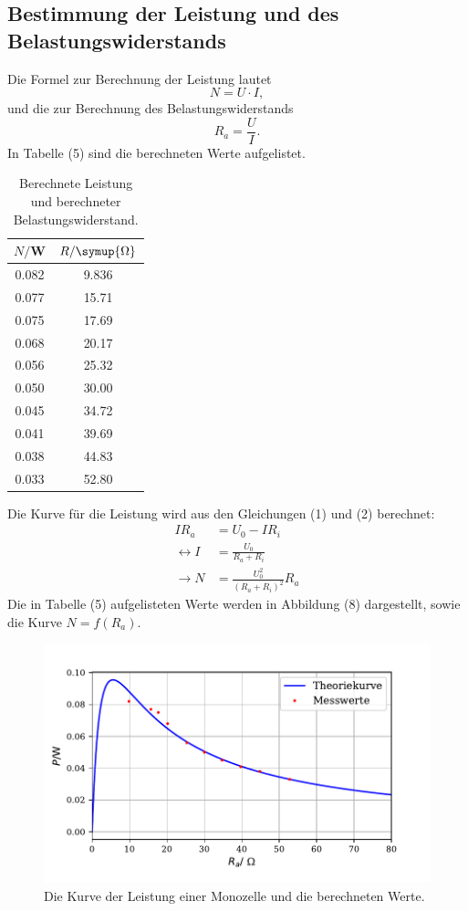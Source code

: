 \subsection{Bestimmung der Leistung und des Belastungswiderstands}
Die Formel zur Berechnung der Leistung lautet
\begin{equation}
N = U \cdot I ,
\end{equation}
\noindent und die zur Berechnung des Belastungswiderstands
\begin{equation}
R_a = \frac{U}{I} .
\end{equation}
\noindent In Tabelle (5) sind die berechneten Werte aufgelistet.
\begin{table}[H]
  \centering
  \caption{Berechnete Leistung und berechneter Belastungswiderstand.}
  \begin{tabular}{c c}
    \toprule
    $N/$W & $R/ \symup{\Omega}$  \\
    \midrule
    0.082 & 9.836 \\
    0.077 & 15.71 \\
    0.075 & 17.69 \\
    0.068 & 20.17 \\
    0.056 & 25.32 \\
    0.050 & 30.00 \\
    0.045 & 34.72 \\
    0.041 & 39.69 \\
    0.038 & 44.83 \\
    0.033 & 52.80 \\
   
  \bottomrule
  \end{tabular}
\end{table}

\noindent Die Kurve für die Leistung wird aus den Gleichungen (1) und (2) berechnet:
\begin{align*}
I R_a &= U_0 - I R_i \\
\leftrightarrow I &= \frac{U_0}{R_a + R_i} \\
\rightarrow N &= \frac{U_0^2}{(R_a + R_i)^2}R_a
\end{align*}
\noindent Die in Tabelle (5) aufgelisteten Werte werden in Abbildung (8) dargestellt, sowie 
die Kurve $N=f(R_a)$.
\begin{figure}[H]
  \centering
  \includegraphics{plot5.pdf}
  \caption{Die Kurve der Leistung einer Monozelle und die berechneten Werte.}
\end{figure}
